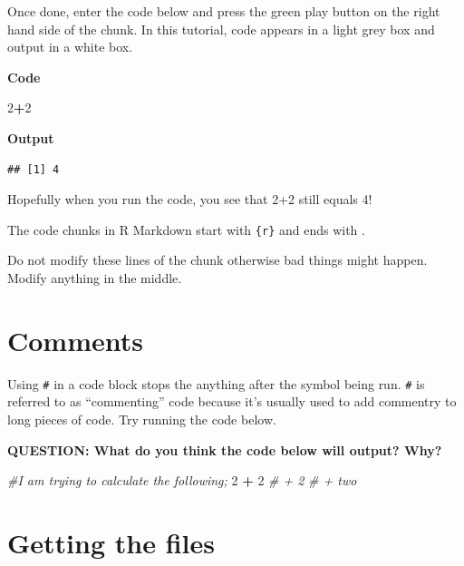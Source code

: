 \documentclass[]{book}
\newenvironment{Shaded}{\begin{snugshade}}{\end{snugshade}}
\newcommand{\CommentTok}[1]{\textcolor[rgb]{0.56,0.35,0.01}{\textit{#1}}}
\newcommand{\DecValTok}[1]{\textcolor[rgb]{0.00,0.00,0.81}{#1}}
\newcommand{\OperatorTok}[1]{\textcolor[rgb]{0.81,0.36,0.00}{\textbf{#1}}}
\newcommand{\StringTok}[1]{\textcolor[rgb]{0.31,0.60,0.02}{#1}}
\begin{document}
Once done, enter the code below and press the green play button on the right hand side of the chunk. In this tutorial, code appears in a light grey box and output in a white box.

\textbf{Code}

\begin{Shaded}
\begin{Highlighting}[]
\DecValTok{2}\OperatorTok{+}\DecValTok{2}
\end{Highlighting}
\end{Shaded}

\textbf{Output}

\begin{verbatim}
## [1] 4
\end{verbatim}

Hopefully when you run the code, you see that 2+2 still equals 4!

The code chunks in R Markdown start with \texttt{\textasciigrave{}\textasciigrave{}\textasciigrave{}\{r\}} and ends with \texttt{\textasciigrave{}\textasciigrave{}\textasciigrave{}}.

Do not modify these lines of the chunk otherwise bad things might happen. Modify anything in the middle.

\hypertarget{comments}{%
\section{Comments}\label{comments}}

Using \texttt{\#} in a code block stops the anything after the symbol being run. \texttt{\#} is referred to as ``commenting'' code because it's usually used to add commentry to long pieces of code. Try running the code below.

\textbf{QUESTION: What do you think the code below will output? Why?}

\begin{Shaded}
\begin{Highlighting}[]
\CommentTok{#I am trying to calculate the following;}
\DecValTok{2} \OperatorTok{+}\StringTok{ }\DecValTok{2} \CommentTok{# + 2}
\CommentTok{# + two}
\end{Highlighting}
\end{Shaded}

\hypertarget{getting-the-files}{%
\section{Getting the files}\label{getting-the-files}}
\end{document}
